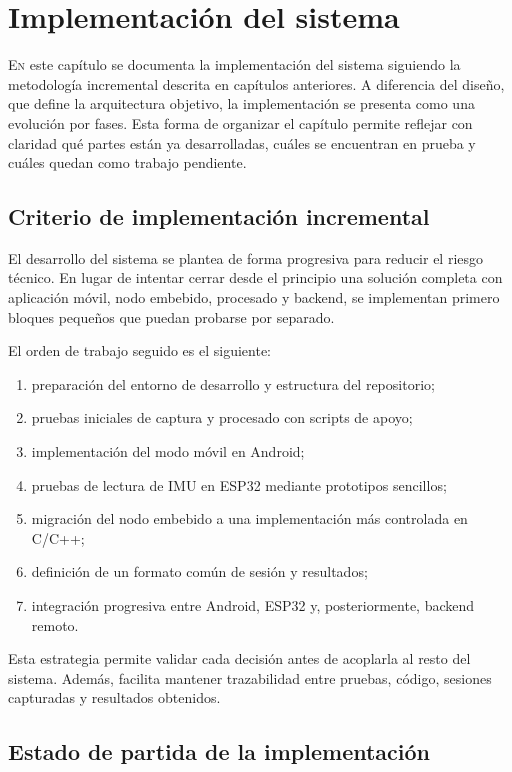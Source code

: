 \chapter{Implementación del sistema}
\label{chap:implementacion}

\lettrine{E}{n} este capítulo se documenta la implementación del sistema siguiendo la metodología incremental descrita en capítulos anteriores. A diferencia del diseño, que define la arquitectura objetivo, la implementación se presenta como una evolución por fases. Esta forma de organizar el capítulo permite reflejar con claridad qué partes están ya desarrolladas, cuáles se encuentran en prueba y cuáles quedan como trabajo pendiente.

\section{Criterio de implementación incremental}

El desarrollo del sistema se plantea de forma progresiva para reducir el riesgo técnico. En lugar de intentar cerrar desde el principio una solución completa con aplicación móvil, nodo embebido, procesado y backend, se implementan primero bloques pequeños que puedan probarse por separado.

El orden de trabajo seguido es el siguiente:

\begin{enumerate}
  \item preparación del entorno de desarrollo y estructura del repositorio;
  \item pruebas iniciales de captura y procesado con scripts de apoyo;
  \item implementación del modo móvil en Android;
  \item pruebas de lectura de IMU en ESP32 mediante prototipos sencillos;
  \item migración del nodo embebido a una implementación más controlada en C/C++;
  \item definición de un formato común de sesión y resultados;
  \item integración progresiva entre Android, ESP32 y, posteriormente, backend remoto.
\end{enumerate}

Esta estrategia permite validar cada decisión antes de acoplarla al resto del sistema. Además, facilita mantener trazabilidad entre pruebas, código, sesiones capturadas y resultados obtenidos.

\section{Estado de partida de la implementación}

